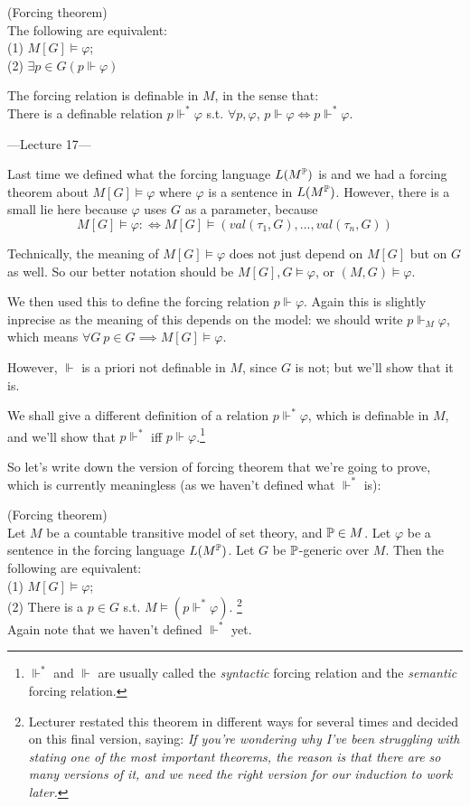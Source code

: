 \documentclass[a4paper]{article}
\begin{document}
\begin{thm} (Forcing theorem)\\
The following are equivalent:\\
(1) $M[G] \vDash \varphi$;\\
(2) $\exists p \in G (p \Vdash \varphi)$
\end{thm}

\begin{thm}
The forcing relation is definable in $M$, in the sense that:\\
There is a definable relation $p \Vdash^* \varphi$ s.t. $\forall p,\varphi$, $p \Vdash \varphi \iff p \Vdash^* \varphi$.
\end{thm}

---Lecture 17---

Last time we defined what the forcing language $L(M^\P)$ is and we had a forcing theorem about $M[G] \vDash \varphi$ where $\varphi$ is a sentence in $L(M^\P)$. However, there is a small lie here because $\varphi$ uses $G$ as a parameter, because
\[
M[G] \vDash \varphi :\iff M[G] \vDash (val(\tau_1,G),...,val(\tau_n,G))
\]

Technically, the meaning of $M[G] \vDash \varphi$ does not just depend on $M[G]$ but on $G$ as well. So our better notation should be $M[G],G \vDash \varphi$, or $(M,G) \vDash \varphi$.

We then used this to define the forcing relation $p \Vdash \varphi$. Again this is slightly inprecise as the meaning of this depends on the model: we should write $p \Vdash_M \varphi$, which means $\forall G\ p \in G \implies M[G] \vDash \varphi$.

However, $\Vdash$ is a priori not definable in $M$, since $G$ is not; but we'll show that it is.

We shall give a different definition of a relation $p \Vdash^* \varphi$, which is definable in $M$, and we'll show that $p \Vdash^*$ iff $p \Vdash \varphi$.\footnote{$\Vdash^*$ and $\Vdash$ are usually called the \emph{syntactic} forcing relation and the \emph{semantic} forcing relation.}

So let's write down the version of forcing theorem that we're going to prove, which is currently meaningless (as we haven't defined what $\Vdash^*$ is):
\begin{thm} (Forcing theorem)\\
Let $M$ be a countable transitive model of set theory, and $\P \in M$. Let $\varphi$ be a sentence in the forcing language $L(M^\P)$. Let $G$ be $\P$-generic over $M$. Then the following are equivalent:\\
(1) $M[G] \vDash \varphi$;\\
(2) There is a $p \in G$ s.t. $M \vDash (p \Vdash^* \varphi)$. \footnote{Lecturer restated this theorem in different ways for several times and decided on this final version, saying: \emph{If you're wondering why I've been struggling with stating one of the most important theorems, the reason is that there are so many versions of it, and we need the right version for our induction to work later.}}\\
Again note that we haven't defined $\Vdash^*$ yet.
\end{thm}
\end{document}
